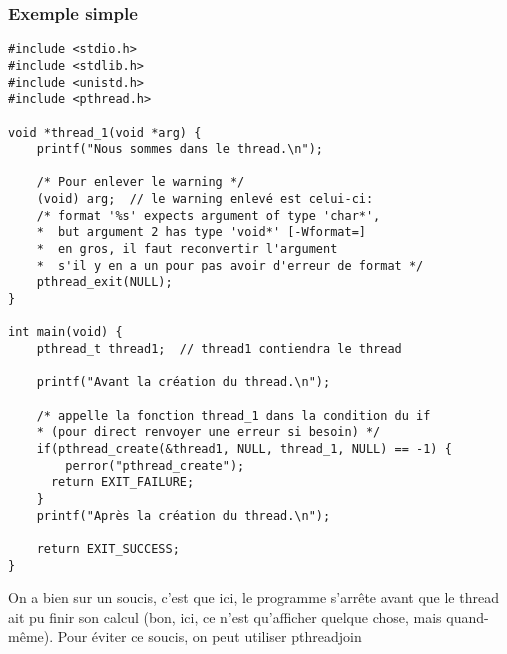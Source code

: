 \documentclass[a4paper]{article}
\begin{document}
\subsubsection{Exemple simple}
\begin{lstlisting}
#include <stdio.h>
#include <stdlib.h>
#include <unistd.h>
#include <pthread.h>

void *thread_1(void *arg) {
    printf("Nous sommes dans le thread.\n");

    /* Pour enlever le warning */
    (void) arg;  // le warning enlevé est celui-ci:
    /* format '%s' expects argument of type 'char*',
    *  but argument 2 has type 'void*' [-Wformat=]
    *  en gros, il faut reconvertir l'argument
    *  s'il y en a un pour pas avoir d'erreur de format */
    pthread_exit(NULL);
}

int main(void) {
    pthread_t thread1;  // thread1 contiendra le thread

    printf("Avant la création du thread.\n");

    /* appelle la fonction thread_1 dans la condition du if
    * (pour direct renvoyer une erreur si besoin) */
    if(pthread_create(&thread1, NULL, thread_1, NULL) == -1) {
	    perror("pthread_create");
      return EXIT_FAILURE;
    }
    printf("Après la création du thread.\n");

    return EXIT_SUCCESS;
}
\end{lstlisting}
On a bien sur un soucis, c'est que ici, le programme s'arrête avant que le thread ait pu finir son calcul (bon, ici, ce n'est qu'afficher quelque chose, mais quand-même). Pour éviter ce soucis, on peut utiliser \guillemotleft{} pthread\textunderscore{}join \guillemotright{}
\end{document}

